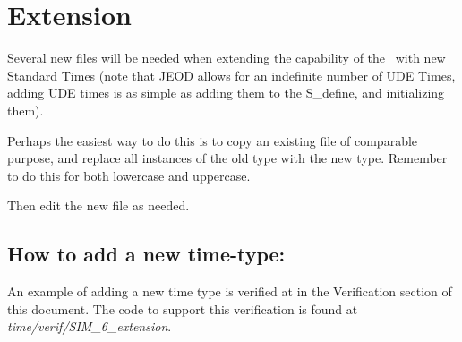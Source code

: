 %
%
%
%

 \section{Extension}\label{sec:User_Extension}

Several new files will be needed when extending the capability of the
\timeDesc\ with new Standard Times (note that JEOD allows for an
indefinite number of UDE Times, adding UDE times is as simple as adding
them to the S\_define, and initializing them).

Perhaps the easiest way to do this is to copy an existing file of
comparable purpose, and replace all instances of the old type with the
new type.  Remember to do this for both lowercase and uppercase.

Then edit the new file as needed.

\subsection{How to add a new time-type:}
\label{ref:Howtoaddanewtimetype}

An example of adding a new time type is verified at
 in the Verification section of this
document.  The code to support this verification is found at
\textit{time/verif/SIM\_6\_extension}.


